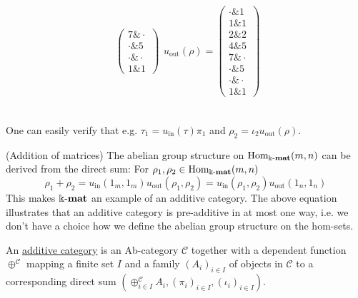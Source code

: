 \begin{example}
\begin{minipage}[t]{.5\textwidth}
\begin{align*}
\begin{array}{rr}
\begin{pmatrix}
7 \ampersand \cdot \\
\cdot \ampersand 5 \\
\cdot \ampersand \cdot \\
1 \ampersand 1
\end{pmatrix}
\end{array}
u_{\text{out}}(\rho) = \begin{pmatrix}
\cdot \ampersand 1 \\
1 \ampersand 1 \\
2 \ampersand 2 \\
4 \ampersand 5 \\
7 \ampersand \cdot \\
\cdot \ampersand 5 \\
\cdot \ampersand \cdot \\
1 \ampersand 1
\end{pmatrix}
\end{align*}
\end{minipage}\\

\noindent One can easily verify that e.g. $\tau_{1} = u_{\mathrm{in}}(\tau) \pi_{1}$ and $\rho_{2} = \iota_{2} u_{\mathrm{out}}(\rho)$.
\end{example}

\begin{remark}{(Addition of matrices)}
The abelian group structure on $\mathrm{Hom}_{\Bbbk\textnormal{-}\mathbf{mat}}(m,n)$ can be derived from the direct sum:
For $\rho_{1}, \rho_{2} \in \mathrm{Hom}_{\Bbbk\textnormal{-}\mathbf{mat}}(m,n)$
\[
\rho_{1} + \rho_{2} = u_{\mathrm{in}}(1_{m},1_{m}) u_{\mathrm{out}}(\rho_{1},\rho_{2}) 
= u_{\mathrm{in}}(\rho_{1},\rho_{2})u_{\mathrm{out}}(1_{n},1_{n})
\]
This makes $\Bbbk\textnormal{-}\mathbf{mat}$ an example of an additive category. The above equation illustrates that an additive category is
pre-additive in at most one way, i.e. we don't have a choice how we define the abelian group structure on the hom-sets.
\end{remark}

\begin{definition}\label{def:additive_category}
An \ul{additive category} is an Ab-category $\mathcal{C}$ together with a dependent function $\oplus^{\mathcal{C}}$ mapping
a finite set $I$ and a family $(A_{i})_{i\in I}$ of objects in $\mathcal{C}$ to a corresponding direct sum $(\oplus_{i\in I}^{\mathcal{C}} A_{i},
(\pi_{i})_{i\in I}, (\iota_{i})_{i\in I})$.
\end{definition}

